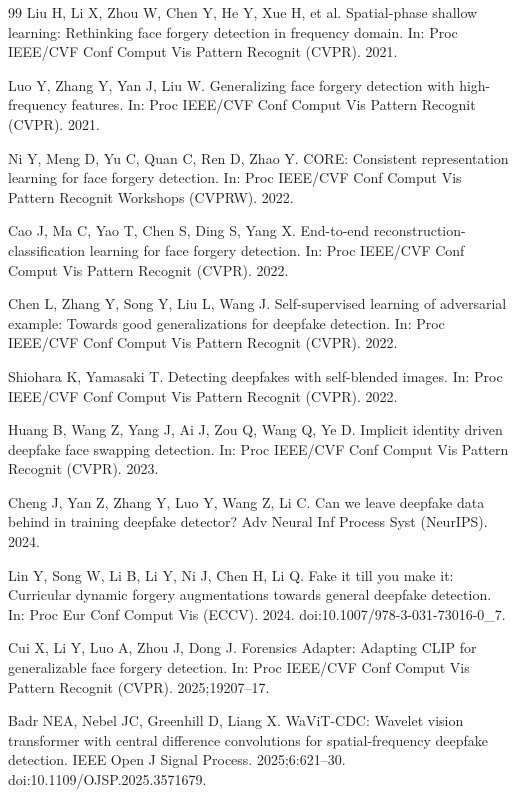 \begin{thebibliography}{99}
Liu H, Li X, Zhou W, Chen Y, He Y, Xue H, et al.
Spatial-phase shallow learning: Rethinking face forgery detection in frequency domain.
In: Proc IEEE/CVF Conf Comput Vis Pattern Recognit (CVPR). 2021.

Luo Y, Zhang Y, Yan J, Liu W.
Generalizing face forgery detection with high-frequency features.
In: Proc IEEE/CVF Conf Comput Vis Pattern Recognit (CVPR). 2021.

Ni Y, Meng D, Yu C, Quan C, Ren D, Zhao Y.
CORE: Consistent representation learning for face forgery detection.
In: Proc IEEE/CVF Conf Comput Vis Pattern Recognit Workshops (CVPRW). 2022.

Cao J, Ma C, Yao T, Chen S, Ding S, Yang X.
End-to-end reconstruction-classification learning for face forgery detection.
In: Proc IEEE/CVF Conf Comput Vis Pattern Recognit (CVPR). 2022.

Chen L, Zhang Y, Song Y, Liu L, Wang J.
Self-supervised learning of adversarial example: Towards good generalizations for deepfake detection.
In: Proc IEEE/CVF Conf Comput Vis Pattern Recognit (CVPR). 2022.

Shiohara K, Yamasaki T.
Detecting deepfakes with self-blended images.
In: Proc IEEE/CVF Conf Comput Vis Pattern Recognit (CVPR). 2022.

Huang B, Wang Z, Yang J, Ai J, Zou Q, Wang Q, Ye D.
Implicit identity driven deepfake face swapping detection.
In: Proc IEEE/CVF Conf Comput Vis Pattern Recognit (CVPR). 2023.

Cheng J, Yan Z, Zhang Y, Luo Y, Wang Z, Li C.
Can we leave deepfake data behind in training deepfake detector?
Adv Neural Inf Process Syst (NeurIPS). 2024.

Lin Y, Song W, Li B, Li Y, Ni J, Chen H, Li Q.
Fake it till you make it: Curricular dynamic forgery augmentations towards general deepfake detection.
In: Proc Eur Conf Comput Vis (ECCV). 2024. doi:10.1007/978-3-031-73016-0\_7.

Cui X, Li Y, Luo A, Zhou J, Dong J.
Forensics Adapter: Adapting CLIP for generalizable face forgery detection.
In: Proc IEEE/CVF Conf Comput Vis Pattern Recognit (CVPR). 2025;19207--17.

Badr NEA, Nebel JC, Greenhill D, Liang X.
WaViT-CDC: Wavelet vision transformer with central difference convolutions for spatial-frequency deepfake detection.
IEEE Open J Signal Process. 2025;6:621--30. doi:10.1109/OJSP.2025.3571679.


\end{thebibliography}

